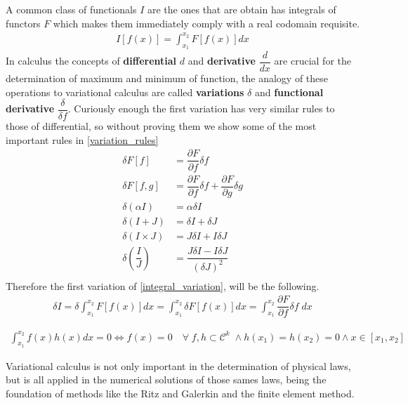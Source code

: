 A common class of  functionals $I$ are the ones that are obtain has integrals of functors $F$ which makes them immediately comply with a real codomain requisite.
\begin{gather}
I[f(x)]=\int_{x_1}^{x_2}F[f(x)]dx
\label{integral_variation}
\end{gather}  
In calculus the concepts of \textbf{differential} $d$ and \textbf{derivative} $\dfrac{d}{dx}$ are crucial for the determination of maximum and minimum of function, the analogy of these operations to variational calculus are called \textbf{variations} $\delta$ and \textbf{functional derivative} $\dfrac{\delta}{\delta f}$.
Curiously enough the first variation has very similar rules to those of differential, so without proving them we show some of the most important rules in \eqref{variation_rules}
\begin{subequations}
\begin{align}
\delta F[f]&=\dfrac{\partial F}{\partial f}\delta f\\
\delta F[f,g]&=\dfrac{\partial F}{\partial f}\delta f + \dfrac{\partial F}{\partial g}\delta g\\
\delta (\alpha I)&= \alpha \delta I\\
\delta (I+J)&=\delta I + \delta J\\
\delta (I\times J)&=J\delta I + I\delta J\\
\delta \left( \dfrac{I}{J} \right)&=\dfrac{J\delta I - I\delta J}{(\delta J)^2}\\
\end{align}\label{variation_rules}
\end{subequations}
Therefore the first variation of \eqref{integral_variation}, will be the following.
\begin{gather}
\delta I = \delta \int_{x_1}^{x_2}F[f(x)]dx= \int_{x_1}^{x_2} \delta F[f(x)]dx= \int_{x_1}^{x_2} \dfrac{\partial F}{\partial f}\delta f \; dx
\end{gather}
\begin{teo}
\begin{gather}
\int_{x_1}^{x_2} f(x)h(x) dx = 0 \Leftrightarrow f(x)=0 \quad \forall \; f,h \subset \mathcal{C}^k \; \land h(x_1)=h(x_2)=0 \land x \in [x_1,x_2]  
\label{ftv}
\end{gather}
\end{teo}
Variational calculus is not only important in the determination of physical laws, but is all applied in the numerical solutions of those sames laws, being the foundation of  methods like the Ritz and Galerkin and the finite element method. 





